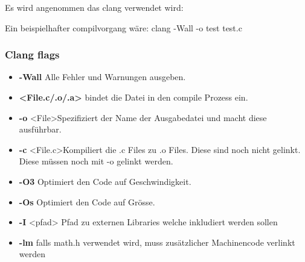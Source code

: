 Es wird angenommen das clang verwendet wird:\newline

Ein beispielhafter compilvorgang wäre:\newline
clang -Wall -o test test.c

\subsubsection{Clang flags}
\begin{itemize}[itemsep=1pt, parsep=0pt]
    \item \textbf{-Wall} Alle Fehler und Warnungen ausgeben.
    \item \textbf{\textless{}File.c/.o/.a\textgreater{}} bindet die Datei in den compile Prozess ein.
    \item \textbf{-o} \textless{}File\textgreater{}Spezifiziert der Name der Ausgabedatei und macht diese ausführbar.
    \item \textbf{-c} \textless{}File.c\textgreater{}Kompiliert die  .c Files zu .o Files. Diese sind noch nicht gelinkt. Diese müssen noch mit -o gelinkt werden.
    \item \textbf{-O3} Optimiert den Code auf Geschwindigkeit.
    \item \textbf{-Os} Optimiert den Code auf Grösse.
    \item \textbf{-I} \textless{}pfad\textgreater{} Pfad zu externen Libraries welche inkludiert werden sollen
    \item \textbf{-lm} falls math.h verwendet wird, muss zusätzlicher Machinencode verlinkt werden
\end{itemize} 